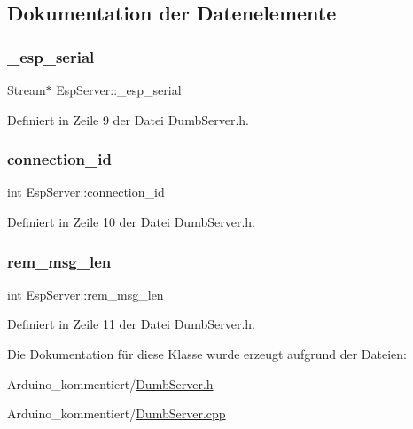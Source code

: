 \subsection{Dokumentation der Datenelemente}
\mbox{\label{class_esp_server_a33166aa92db341d47cdf1776492cca62}} 
\subsubsection{\texorpdfstring{\+\_\+esp\+\_\+serial}{\_esp\_serial}}
{\footnotesize\ttfamily Stream$\ast$ Esp\+Server\+::\+\_\+esp\+\_\+serial\hspace{0.3cm}{\ttfamily [private]}}



Definiert in Zeile 9 der Datei Dumb\+Server.\+h.

\mbox{\label{class_esp_server_ab601ba8cdf21497e04e862f22e52c590}} 
\subsubsection{\texorpdfstring{connection\+\_\+id}{connection\_id}}
{\footnotesize\ttfamily int Esp\+Server\+::connection\+\_\+id\hspace{0.3cm}{\ttfamily [private]}}



Definiert in Zeile 10 der Datei Dumb\+Server.\+h.

\mbox{\label{class_esp_server_a0cff51089b75a6edf347b86727683e7f}} 
\subsubsection{\texorpdfstring{rem\+\_\+msg\+\_\+len}{rem\_msg\_len}}
{\footnotesize\ttfamily int Esp\+Server\+::rem\+\_\+msg\+\_\+len\hspace{0.3cm}{\ttfamily [private]}}



Definiert in Zeile 11 der Datei Dumb\+Server.\+h.



Die Dokumentation für diese Klasse wurde erzeugt aufgrund der Dateien\+:\begin{DoxyCompactItemize}
\item 
Arduino\+\_\+kommentiert/\hyperlink{_dumb_server_8h}{Dumb\+Server.\+h}\item 
Arduino\+\_\+kommentiert/\hyperlink{_dumb_server_8cpp}{Dumb\+Server.\+cpp}\end{DoxyCompactItemize}
